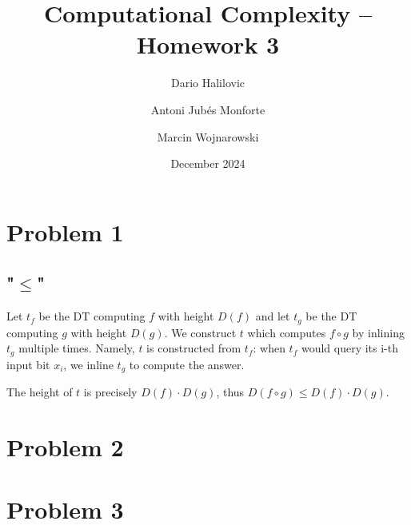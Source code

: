 \documentclass{article}
\title{Computational Complexity -- Homework 3}
\author{Dario Halilovic\and
Antoni Jubés Monforte\and
Marcin Wojnarowski}
\date{December 2024}
\begin{document}
\maketitle

\section*{Problem 1}

\subsection*{"$\le$"}

Let $t_f$ be the DT computing $f$ with height $D(f)$ and let $t_g$ be the DT computing $g$ with height $D(g)$. We construct $t$ which computes $f \circ g$ by inlining $t_g$ multiple times. Namely, $t$ is constructed from $t_f$: when $t_f$ would query its i-th input bit $x_i$, we inline $t_g$ to compute the answer.

The height of $t$ is precisely $D(f) \cdot D(g)$, thus $D(f \circ g) \le D(f) \cdot D(g)$.


\section*{Problem 2}

\section*{Problem 3}
\end{document}
